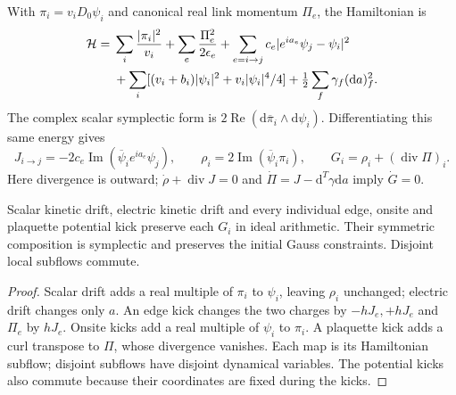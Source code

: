 With $\pi_i=v_iD_0\psi_i$ and canonical real link momentum $\Pi_e$, the
Hamiltonian is
\begin{align}
 \mathcal H={}&\sum_i\frac{|\pi_i|^2}{v_i}
   +\sum_e\frac{\Pi_e^2}{2\epsilon_e}
   +\sum_{e=i\to j}c_e|e^{ia_e}\psi_j-\psi_i|^2\notag\\
 &+\sum_i[(v_i+b_i)|\psi_i|^2+v_i|\psi_i|^4/4]
   +\tfrac12\sum_f\gamma_f(\mathrm da)_f^2 .
\end{align}
The complex scalar symplectic form is
$2\operatorname{Re}(\mathrm d\overline\pi_i\wedge\mathrm d\psi_i)$.
Differentiating this same energy gives
\[
 J_{i\to j}=-2c_e\operatorname{Im}(\overline\psi_i e^{ia_e}\psi_j),\qquad
 \rho_i=2\operatorname{Im}(\overline\psi_i\pi_i),\qquad
 G_i=\rho_i+(\operatorname{div}\Pi)_i.
\]
Here divergence is outward; $\dot\rho+\operatorname{div}J=0$ and
$\dot\Pi=J-\mathrm d^T\gamma\mathrm da$ imply $\dot G=0$.

\begin{proposition}
\label{prop:cartan-scalar-split-gauss}
Scalar kinetic drift, electric kinetic drift and every individual edge,
onsite and plaquette potential kick preserve each $G_i$ in ideal
arithmetic. Their symmetric composition is symplectic and preserves the
initial Gauss constraints. Disjoint local subflows commute.
\end{proposition}
\begin{proof}
Scalar drift adds a real multiple of $\pi_i$ to $\psi_i$, leaving $\rho_i$
unchanged; electric drift changes only $a$. An edge kick changes the two
charges by $-hJ_e,+hJ_e$ and $\Pi_e$ by $hJ_e$. Onsite kicks add a real
multiple of $\psi_i$ to $\pi_i$. A plaquette kick adds a curl transpose to
$\Pi$, whose divergence vanishes. Each map is its Hamiltonian subflow;
disjoint subflows have disjoint dynamical variables. The potential kicks
also commute because their coordinates are fixed during the kicks.
\end{proof}

